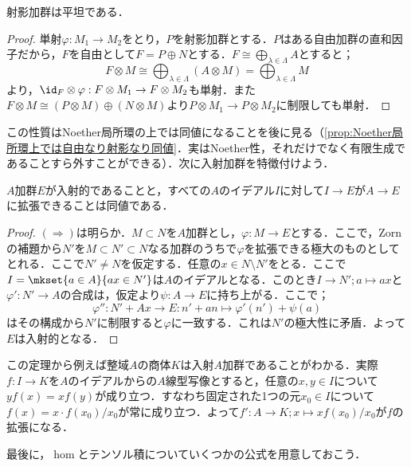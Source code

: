 \begin{cor}
	射影加群は平坦である．
\end{cor}
\begin{proof}
	単射$\varphi:M_1\to M_2$をとり，$P$を射影加群とする．$P$はある自由加群の直和因子だから，$F$を自由として$F=P\oplus N$とする．$F\cong \bigoplus_{\lambda\in\Lambda}A$とすると；
	\[F\otimes M\cong \bigoplus_{\lambda\in\Lambda} (A\otimes M)=\bigoplus_{\lambda\in\Lambda} M\]
	より，$\id_{F}\otimes\varphi:F\otimes M_1\to F\otimes M_2$も単射．また$F\otimes M\cong (P\otimes M)\oplus (N\otimes M)$より$P\otimes M_1\to P\otimes M_2$に制限しても単射．
\end{proof}

この性質はNoether局所環の上では同値になることを後に見る（\ref{prop:Noether局所環上では自由なり射影なり同値}．実はNoether性，それだけでなく有限生成であることすら外すことができる）．次に入射加群を特徴付けよう．

\begin{thm}\label{thm:Baer's Criterion}
	$A$加群$E$が入射的であることと，すべての$A$のイデアル$I$に対して$I\to E$が$A\to E$に拡張できることは同値である．
\end{thm}

\begin{proof}
	$(\Longrightarrow)$は明らか．$M\subset N$を$A$加群とし，$\varphi:M\to E$とする．ここで，Zornの補題から$N'$を$M\subset N'\subset N$なる加群のうちで$\varphi$を拡張できる極大のものとしてとれる．ここで$N'\neq N$を仮定する．任意の$x\in N\setminus N'$をとる．ここで$I=\mkset{a\in A}{ax\in N'}$は$A$のイデアルとなる．このとき$I\to N';a\mapsto ax$と$\varphi':N'\to A$の合成は，仮定より$\psi:A\to E$に持ち上がる．ここで；
	\[\varphi'':N'+Ax\to E:n'+an\mapsto \varphi'(n')+\psi(a)\]
	はその構成から$N'$に制限すると$\varphi$に一致する．これは$N'$の極大性に矛盾．よって$E$は入射的となる． 
\end{proof}

この定理から例えば整域$A$の商体$K$は入射$A$加群であることがわかる．実際$f:I\to K$を$A$のイデアルからの$A$線型写像とすると，任意の$x,y\in I$について$yf(x)=xf(y)$が成り立つ．すなわち固定された1つの元$x_0\in I$について$f(x)=x\cdot f(x_0)/x_0$が常に成り立つ．よって$f':A\to K;x\mapsto xf(x_0)/x_0$が$f$の拡張になる．

最後に，$\hom$とテンソル積についていくつかの公式を用意しておこう．

